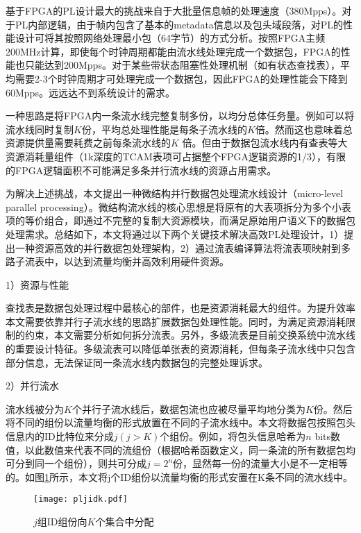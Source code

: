 基于FPGA的PL设计最大的挑战来自于大批量信息帧的处理速度（380Mpps）。对于PL内部逻辑，由于帧内包含了基本的metadata信息以及包头域段落，对PL的性能设计可将其按照网络处理最小包（64字节）的方式分析。按照FPGA主频200MHz计算，即使每个时钟周期都能由流水线处理完成一个数据包，FPGA的性能也只能达到200Mpps。对于某些带状态阻塞性处理机制（如有状态查找表），平均需要2-3个时钟周期才可处理完成一个数据包，因此FPGA的处理性能会下降到60Mpps。远远达不到系统设计的需求。

一种思路是将FPGA内一条流水线完整复制多份，以均分总体任务量。例如可以将流水线同时复制$K$份，平均总处理性能是每条子流水线的$K$倍。然而这也意味着总资源提供量需要耗费之前每条流水线的$K$ 倍。但由于数据包流水线内有查表等大资源消耗量组件（1k深度的TCAM表项可占据整个FPGA逻辑资源的1/3），有限的FPGA逻辑面积不可能满足多条并行流水线的资源占用需求。

为解决上述挑战，本文提出一种微结构并行数据包处理流水线设计（micro-level parallel processing）。微结构流水线的核心思想是将原有的大表项拆分为多个小表项的等价组合，即通过不完整的复制大资源模块，而满足原始用户语义下的数据包处理需求。总结如下，本文将通过以下两个关键技术解决高效PL处理设计，1）提出一种资源高效的并行数据包处理架构，2）通过流表编译算法将流表项映射到多路子流表中，以达到流量均衡并高效利用硬件资源。

1）资源与性能

查找表是数据包处理过程中最核心的部件，也是资源消耗最大的组件。为提升效率本文需要依靠并行子流水线的思路扩展数据包处理性能。同时，为满足资源消耗限制的约束，本文需要分析如何拆分流表。另外，多级流表是目前交换系统中流水线的重要设计特征。多级流表可以降低单张表的资源消耗，但每条子流水线中只包含部分信息，无法保证同一条流水线内数据包的完整处理诉求。 




2）并行流水

流水线被分为$K$个并行子流水线后，数据包流也应被尽量平均地分类为$K$份。然后将不同的组份以流量均衡的形式放置在不同的子流水线中。本文将数据包按照包头信息内的ID比特位来分成$j (j > K)$个组份。例如，将包头信息哈希为$n$ bits数值，以此数值来代表不同的流组份（根据哈希函数定义，同一条流的所有数据包均可分到同一个组份），则共可分成$j=2^{n}$份，显然每一份的流量大小是不一定相等的。如图\ref{fig:pljidk}所示，本文将j个ID组份以流量均衡的形式安置在K条不同的流水线中。

\begin{figure}[!ht]
	\centering 
	\texttt{[image: pljidk.pdf]}
	\caption{$ j $组ID组份向$ K $个集合中分配} \label{fig:pljidk}
\end{figure}

